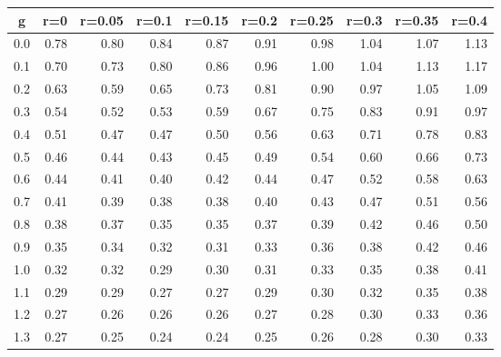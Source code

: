 %
\begin{table}[!tbp]
 \begin{center}
 \begin{tabular}{rrrrrrrrrr}\hline\hline
\multicolumn{1}{c}{g}&\multicolumn{1}{c}{r=0}&\multicolumn{1}{c}{r=0.05}&\multicolumn{1}{c}{r=0.1}&\multicolumn{1}{c}{r=0.15}&\multicolumn{1}{c}{r=0.2}&\multicolumn{1}{c}{r=0.25}&\multicolumn{1}{c}{r=0.3}&\multicolumn{1}{c}{r=0.35}&\multicolumn{1}{c}{r=0.4}\tabularnewline
\hline
0.0&0.78&0.80&0.84&0.87&0.91&0.98&1.04&1.07&1.13\tabularnewline
0.1&0.70&0.73&0.80&0.86&0.96&1.00&1.04&1.13&1.17\tabularnewline
0.2&0.63&0.59&0.65&0.73&0.81&0.90&0.97&1.05&1.09\tabularnewline
0.3&0.54&0.52&0.53&0.59&0.67&0.75&0.83&0.91&0.97\tabularnewline
0.4&0.51&0.47&0.47&0.50&0.56&0.63&0.71&0.78&0.83\tabularnewline
0.5&0.46&0.44&0.43&0.45&0.49&0.54&0.60&0.66&0.73\tabularnewline
0.6&0.44&0.41&0.40&0.42&0.44&0.47&0.52&0.58&0.63\tabularnewline
0.7&0.41&0.39&0.38&0.38&0.40&0.43&0.47&0.51&0.56\tabularnewline
0.8&0.38&0.37&0.35&0.35&0.37&0.39&0.42&0.46&0.50\tabularnewline
0.9&0.35&0.34&0.32&0.31&0.33&0.36&0.38&0.42&0.46\tabularnewline
1.0&0.32&0.32&0.29&0.30&0.31&0.33&0.35&0.38&0.41\tabularnewline
1.1&0.29&0.29&0.27&0.27&0.29&0.30&0.32&0.35&0.38\tabularnewline
1.2&0.27&0.26&0.26&0.26&0.27&0.28&0.30&0.33&0.36\tabularnewline
1.3&0.27&0.25&0.24&0.24&0.25&0.26&0.28&0.30&0.33\tabularnewline
\hline
\end{tabular}

\end{center}

\end{table}

